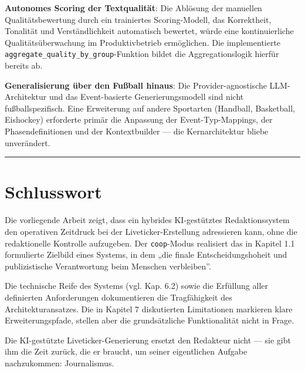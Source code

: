 \textbf{Autonomes Scoring der Textqualität}: Die Ablösung der manuellen
Qualitätsbewertung durch ein trainiertes Scoring-Modell, das
Korrektheit, Tonalität und Verständlichkeit automatisch bewertet, würde
eine kontinuierliche Qualitätsüberwachung im Produktivbetrieb
ermöglichen. Die implementierte
\texttt{aggregate\_quality\_by\_group}-Funktion bildet die
Aggregationslogik hierfür bereits ab.

\textbf{Generalisierung über den Fußball hinaus}: Die
Provider-agnostische LLM-Architektur und das Event-basierte
Generierungsmodell sind nicht fußballspezifisch. Eine Erweiterung auf
andere Sportarten (Handball, Basketball, Eishockey) erforderte primär
die Anpassung der Event-Typ-Mappings, der Phasendefinitionen und der
Kontextbuilder --- die Kernarchitektur bliebe unverändert.

\begin{center}\rule{0.5\linewidth}{0.5pt}\end{center}

\section{Schlusswort}\label{schlusswort}

Die vorliegende Arbeit zeigt, dass ein hybrides KI-gestütztes
Redaktionssystem den operativen Zeitdruck bei der Liveticker-Erstellung
adressieren kann, ohne die redaktionelle Kontrolle aufzugeben. Der
\texttt{coop}-Modus realisiert das in Kapitel 1.1 formulierte Zielbild
eines Systems, in dem „die finale Entscheidungshoheit und publizistische
Verantwortung beim Menschen verbleiben''.

Die technische Reife des Systems (vgl. Kap. 6.2) sowie die Erfüllung
aller definierten Anforderungen dokumentieren die Tragfähigkeit des
Architekturansatzes. Die in Kapitel 7 diskutierten Limitationen
markieren klare Erweiterungspfade, stellen aber die grundsätzliche
Funktionalität nicht in Frage.

Die KI-gestützte Liveticker-Generierung ersetzt den Redakteur nicht ---
sie gibt ihm die Zeit zurück, die er braucht, um seiner eigentlichen
Aufgabe nachzukommen: Journalismus.
